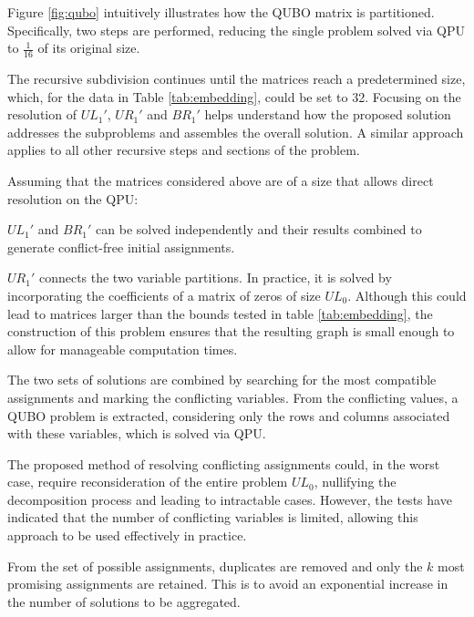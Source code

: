 \documentclass{ceurart}
\begin{document}
\begin{spacing}{1}
Figure \ref{fig:qubo} intuitively illustrates how the QUBO matrix is partitioned. Specifically, two steps are performed, reducing the single problem solved via QPU to $\frac{1}{16}$ of its original size.

The recursive subdivision continues until the matrices reach a predetermined size, which, for the data in Table \ref{tab:embedding}, could be set to 32. Focusing on the resolution of $UL_1'$, $UR_1'$ and $BR_1'$ helps understand how the proposed solution addresses the subproblems and assembles the overall solution. A similar approach applies to all other recursive steps and sections of the problem. 

Assuming that the matrices considered above are of a size that allows direct resolution on the QPU:
\begin{enumerate*}
\item $UL_1'$ and $BR_1'$ can be solved independently and their results combined to generate conflict-free initial assignments.
\item $UR_1'$ connects the two variable partitions. In practice, it is solved by incorporating the coefficients of a matrix of zeros of size $UL_0$. Although this could lead to matrices larger than the bounds tested in table \ref{tab:embedding}, the construction of this problem ensures that the resulting graph is small enough to allow for manageable computation times.
\end{enumerate*}

The two sets of solutions are combined by searching for the most compatible assignments and marking the conflicting variables. From the conflicting values, a QUBO problem is extracted, considering only the rows and columns associated with these variables, which is solved via QPU.

The proposed method of resolving conflicting assignments could, in the worst case, require reconsideration of the entire problem \(UL_0\), nullifying the decomposition process and leading to intractable cases. However, the tests have indicated that the number of conflicting variables is limited, allowing this approach to be used effectively in practice. 

From the set of possible assignments, duplicates are removed and only the $k$ most promising assignments are retained. This is to avoid an exponential increase in the number of solutions to be aggregated.


\end{spacing}
\end{document}
